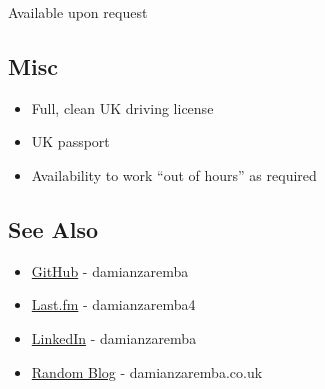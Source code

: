Available upon request

\subsection{Misc}

\begin{itemize}
\item
  Full, clean UK driving license
\item
  UK passport
\item
  Availability to work ``out of hours'' as required
\end{itemize}
\subsection{See Also}

\begin{itemize}
\item
  \href{https://github.com/damianzaremba}{GitHub} - damianzaremba
\item
  \href{http://last.fm/user/damianzaremba4}{Last.fm} - damianzaremba4
\item
  \href{http://uk.linkedin.com/in/damianzaremba}{LinkedIn} -
  damianzaremba
\item
  \href{http://damianzaremba.co.uk}{Random Blog} - damianzaremba.co.uk
\end{itemize}
